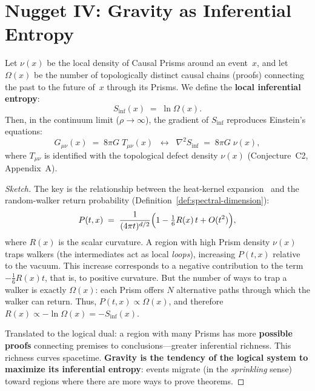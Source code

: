 \section{Nugget IV: Gravity as Inferential Entropy}

\begin{theorem}
\label{thm:gravity-inference-entropy}
Let $\nu(x)$ be the local density of Causal Prisms around an
event~$x$, and let $\Omega(x)$ be the number of topologically
distinct causal chains (proofs) connecting the past
to the future of~$x$ through its Prisms. We define the
\textbf{local inferential entropy}:
\begin{equation}
  S_{\text{inf}}(x) \;=\; \ln \Omega(x).
  \label{eq:inferential-entropy}
\end{equation}
Then, in the continuum limit ($\rho \to \infty$), the gradient
of $S_{\text{inf}}$ reproduces Einstein's equations:
\begin{equation}
  G_{\mu\nu}(x) \;=\; 8\pi G \; T_{\mu\nu}(x)
  \;\;\longleftrightarrow\;\;
  \nabla^2 S_{\text{inf}} \;=\; 8\pi G \;\nu(x),
  \label{eq:einstein-as-entropy}
\end{equation}
where $T_{\mu\nu}$ is identified with the topological defect
density $\nu(x)$ (Conjecture~C2, Appendix~A).
\end{theorem}

\begin{proof}[Sketch]
The key is the relationship between the heat-kernel
expansion~\cite{minakshisundaram1949,gilkey1975} and the
random-walker return probability
(Definition~\ref{def:spectral-dimension}):
\[
  P(t, x) \;=\; \frac{1}{(4\pi t)^{d/2}}
  \Bigl(1 - \tfrac{1}{6}R(x)\,t + O(t^2)\Bigr),
\]
where $R(x)$ is the scalar curvature. A region with high Prism
density $\nu(x)$ traps walkers (the intermediates act as local
\emph{loops}), increasing $P(t,x)$ relative to the vacuum. This
increase corresponds to a negative contribution to the term
$-\tfrac{1}{6}R(x)t$, that is, to positive curvature. But the
number of ways to trap a walker is exactly
$\Omega(x)$: each Prism offers $N$ alternative paths through which
the walker can return. Thus, $P(t,x) \propto \Omega(x)$, and
therefore $R(x) \propto -\ln \Omega(x) = -S_{\text{inf}}(x)$.

Translated to the logical dual: a region with many Prisms has
more \textbf{possible proofs} connecting premises to
conclusions---greater inferential richness. This richness curves
spacetime. \textbf{Gravity is the tendency of the logical
system to maximize its inferential entropy}: events migrate
(in the \emph{sprinkling} sense) toward regions where there are more
ways to prove theorems.
\end{proof}

